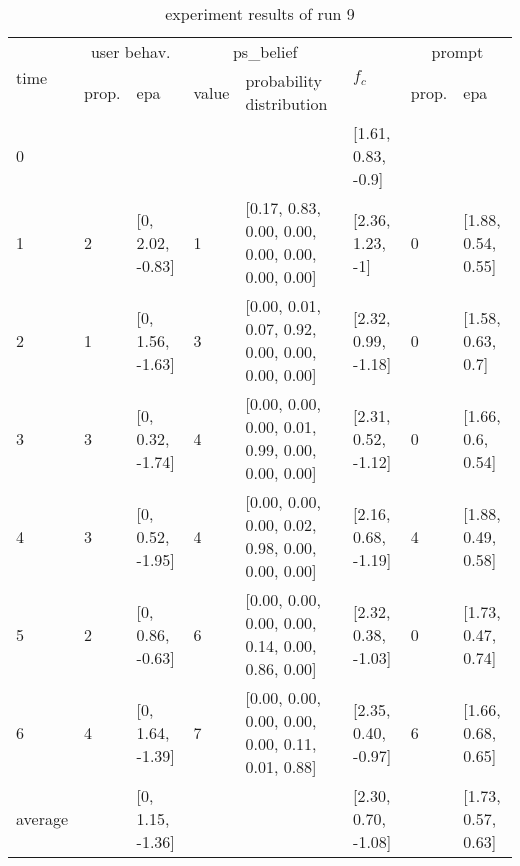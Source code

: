 \begin{table}[htbp]\footnotesize
\caption{experiment results of run 9}
\begin{center}
\begin{tabular}{|p{0.4cm}|p{0.6cm}|l|p{0.6cm}|p{3.3cm}|l|p{0.6cm}|l|}
\hline

\multirow{2}{*}{time} & \multicolumn{2}{c|}{user behav.} & \multicolumn{2}{c|}{ps\_belief} &
\multirow{2}{*}{$f_c$} & \multicolumn{2}{c|}{prompt} \\ \cline{2-5}\cline{ 7- 8}
& prop. & epa & value & probability distribution &  & prop. & epa \\ \hline

0 & \multicolumn{1}{l|}{} &  & \multicolumn{1}{l|}{} &  & [1.61, 0.83, -0.9] & \multicolumn{1}{l|}{} &  \\ \hline
1 & 2 & [0, 2.02, -0.83] & 1 & [0.17, 0.83, 0.00, 0.00, 0.00, 0.00, 0.00, 0.00] & [2.36, 1.23, -1] & 0 & [1.88, 0.54, 0.55] \\ \hline
2 & 1 & [0, 1.56, -1.63] & 3 & [0.00, 0.01, 0.07, 0.92, 0.00, 0.00, 0.00, 0.00] & [2.32, 0.99, -1.18] & 0 & [1.58, 0.63, 0.7] \\ \hline
3 & 3 & [0, 0.32, -1.74] & 4 & [0.00, 0.00, 0.00, 0.01, 0.99, 0.00, 0.00, 0.00] & [2.31, 0.52, -1.12] & 0 & [1.66, 0.6, 0.54] \\ \hline
4 & 3 & [0, 0.52, -1.95] & 4 & [0.00, 0.00, 0.00, 0.02, 0.98, 0.00, 0.00, 0.00] & [2.16, 0.68, -1.19] & 4 & [1.88, 0.49, 0.58] \\ \hline
5 & 2 & [0, 0.86, -0.63] & 6 & [0.00, 0.00, 0.00, 0.00, 0.14, 0.00, 0.86, 0.00] & [2.32, 0.38, -1.03] & 0 & [1.73, 0.47, 0.74] \\ \hline
6 & 4 & [0, 1.64, -1.39] & 7 & [0.00, 0.00, 0.00, 0.00, 0.00, 0.11, 0.01, 0.88] & [2.35, 0.40, -0.97] & 6 & [1.66, 0.68, 0.65] \\ \hline
\multicolumn{1}{|l|}{average} & \multicolumn{1}{l|}{} & [0, 1.15, -1.36] & \multicolumn{1}{l|}{} &  & [2.30, 0.70, -1.08] & \multicolumn{1}{l|}{} & [1.73, 0.57, 0.63] \\ \hline
\end{tabular}
\end{center}
\label{}
\end{table}


